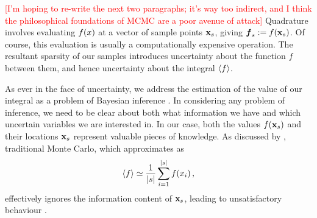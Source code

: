 \documentclass{article}
\begin{document}
\textcolor{red}{[I'm hoping to re-write the next two paragraphs; it's way too indirect, and I think the philosophical foundations of MCMC are a poor avenue of attack]}
Quadrature involves evaluating $f(\lfv)$ at a
vector of sample points $\vlfv_s$, giving $\vf\pha_s\deq
f(\vlfv_s)$. Of course, this evaluation is usually a computationally expensive
operation.
The resultant sparsity of our samples introduces uncertainty about the function $f$ between them, and hence uncertainty about the integral $\inty{f}$.

As ever in the face of uncertainty, we address the estimation of the value of our integral as a problem of Bayesian inference \citep{BZNumericalAnalysis}. In considering any problem of inference, we need to be clear about both what information we have and which uncertain variables we are interested in. In our case, both the values $f(\vlfv_s)$ and their locations $\vlfv_s$ represent valuable pieces of knowledge. As discussed by \citet{MCUnsound}, traditional Monte Carlo, which approximates as
\begin{equation} \label{eq:MC_integral_estimate}
\inty{f} \simeq \frac{1}{\card{s}} \sum_{i=1}^{\card{s}} f(\lfv_i)\,,
\end{equation}
effectively ignores the information content of $\vlfv_s$, leading to unsatisfactory behaviour
.

\end{document}
